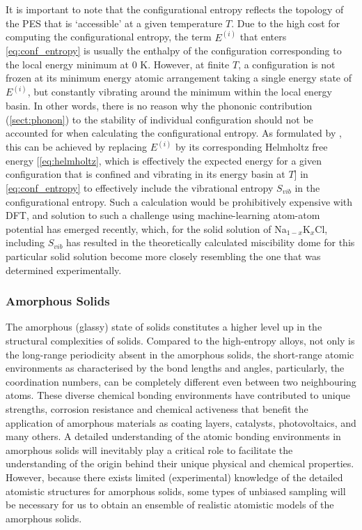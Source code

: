 It is important to note that the configurational entropy reflects the topology of the PES that is `accessible' at a given temperature $T$. Due to the high cost for computing the configurational entropy,  the term $E^{(i)}$ that enters \cref{eq:conf_entropy} is usually the enthalpy of the configuration corresponding to the local energy minimum at 0 K. However, at finite $T$, a configuration is not frozen at its minimum energy  atomic arrangement taking a single energy state of $E^{(i)}$, but constantly vibrating around the minimum within the local energy basin. In other words, there is no reason why the phononic contribution (\cref{sect:phonon}) to the stability of individual configuration should not be accounted for when calculating the configurational entropy. As formulated by \citet{van2002effect}, this can be achieved by replacing $E^{(i)}$ by its corresponding Helmholtz free energy [\cref{eq:helmholtz}, which is effectively the expected energy for a  given configuration that is confined and vibrating in its energy basin at $T$] in \cref{eq:conf_entropy} to effectively include the vibrational entropy $S_{vib}$ in the configurational entropy. Such a calculation would be prohibitively expensive with DFT, and  solution to such a challenge using machine-learning atom-atom potential has emerged recently, \cite{tolborg2023low} which, for the solid solution of Na$_{1-x}$K$_{x}$Cl, including $S_{vib}$ has resulted in the theoretically calculated miscibility dome for this particular solid solution become more closely resembling the one that was determined experimentally.

\subsubsection{Amorphous Solids} The amorphous (glassy) state of solids constitutes a higher level up in the structural complexities of solids. Compared to the high-entropy alloys, not only is the long-range periodicity absent in the amorphous solids, the short-range atomic environments as characterised by the bond lengths and angles, particularly, the coordination numbers, can be completely different even between two neighbouring atoms. These diverse chemical bonding environments have contributed to unique strengths, corrosion resistance and chemical activeness that benefit the application of amorphous materials as coating layers,\cite{joshi2016amorphous} catalysts,\cite{anantharaj2020amorphous}  photovoltaics,\cite{stuckelberger2017progress} and many others. A detailed understanding of the atomic bonding environments in amorphous solids will inevitably play a critical role to facilitate the understanding of the origin behind their unique physical and chemical properties. However, because there exists limited (experimental) knowledge of the detailed atomistic structures for amorphous solids, some types of unbiased sampling will be necessary for us to obtain an ensemble of realistic atomistic models of the amorphous solids. 

